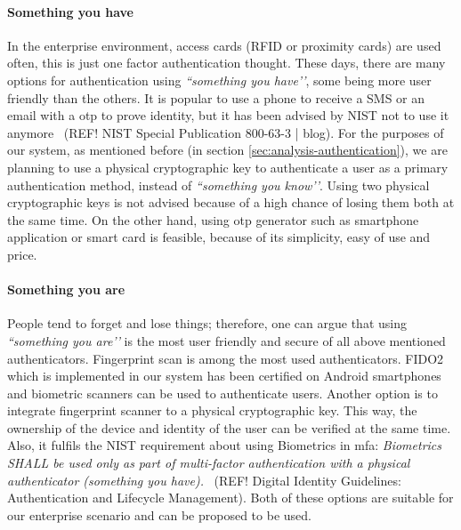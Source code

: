 \paragraph{Something you have}
In the enterprise environment, access cards (RFID or proximity cards) are used often, this is just one factor authentication thought. These days, there are many options for authentication using \textit{``something you have’’}, some being more user friendly than the others. It is popular to use a phone to receive a SMS or an email with a \acrfull{otp} to prove identity, but it has been advised by NIST not to use it anymore~\cite{} (REF! NIST Special Publication 800-63-3 | blog). For the purposes of our system, as mentioned before (in section \ref{sec:analysis-authentication}), we are planning to use a physical cryptographic key to authenticate a user as a primary authentication method, instead of \textit{``something you know’’}. Using two physical cryptographic keys is not advised because of a high chance of losing them both at the same time. On the other hand, using \acrshort{otp} generator such as smartphone application or smart card is feasible, because of its simplicity, easy of use and price. 

\paragraph{Something you are}
People tend to forget and lose things; therefore, one can argue that using \textit{``something you are’’} is the most user friendly and secure of all above mentioned authenticators. Fingerprint scan is among the most used authenticators. FIDO2 which is implemented in our system has been certified on Android smartphones and biometric scanners can be used to authenticate users. Another option is to integrate fingerprint scanner to a physical cryptographic key. This way, the ownership of the device and identity of the user can be verified at the same time. Also, it fulfils the NIST requirement about using Biometrics in \acrshort{mfa}: \textit{Biometrics SHALL be used only as part of multi-factor authentication with a physical authenticator (something you have).}~\cite{} (REF! Digital Identity Guidelines: Authentication and Lifecycle Management). Both of these options are suitable for our enterprise scenario and can be proposed to be used.

